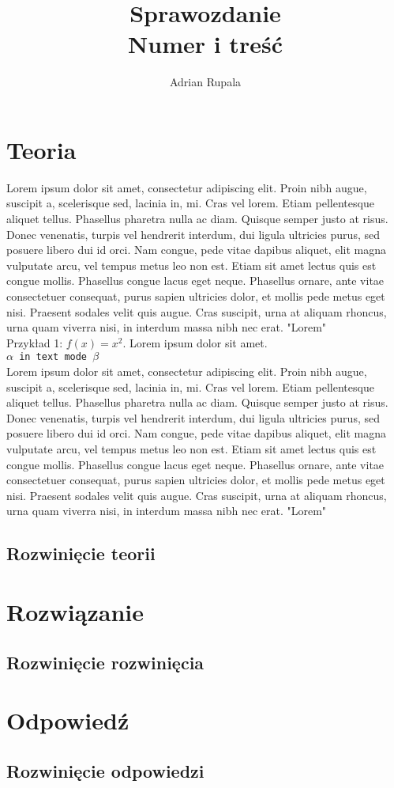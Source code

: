 \documentclass[UTF8]{article}
\title{%
	Sprawozdanie \\
	\large Numer i treść}
\author{Adrian Rupala}
\begin{document}
\maketitle

\newpage
\tableofcontents

\newpage
{}

\section{Teoria}

Lorem ipsum dolor sit amet, consectetur adipiscing elit. Proin nibh augue, suscipit a, scelerisque sed, lacinia in, mi. Cras vel lorem. Etiam pellentesque aliquet tellus. Phasellus pharetra nulla ac diam. Quisque semper justo at risus. Donec venenatis, turpis vel hendrerit interdum, dui ligula ultricies purus, sed posuere libero dui id orci. Nam congue, pede vitae dapibus aliquet, elit magna vulputate arcu, vel tempus metus leo non est. Etiam sit amet lectus quis est congue mollis. Phasellus congue lacus eget neque. Phasellus ornare, ante vitae consectetuer consequat, purus sapien ultricies dolor, et mollis pede metus eget nisi. Praesent sodales velit quis augue. Cras suscipit, urna at aliquam rhoncus, urna quam viverra nisi, in interdum massa nibh nec erat. "Lorem"~\\

Przykład 1: $ f(x) = x^2 $. Lorem ipsum dolor sit amet.~\\

\texttt{$\alpha$ in text mode $\beta$}\\

Lorem ipsum dolor sit amet, consectetur adipiscing elit. Proin nibh augue, suscipit a, scelerisque sed, lacinia in, mi. Cras vel lorem. Etiam pellentesque aliquet tellus. Phasellus pharetra nulla ac diam. Quisque semper justo at risus. Donec venenatis, turpis vel hendrerit interdum, dui ligula ultricies purus, sed posuere libero dui id orci. Nam congue, pede vitae dapibus aliquet, elit magna vulputate arcu, vel tempus metus leo non est. Etiam sit amet lectus quis est congue mollis. Phasellus congue lacus eget neque. Phasellus ornare, ante vitae consectetuer consequat, purus sapien ultricies dolor, et mollis pede metus eget nisi. Praesent sodales velit quis augue. Cras suscipit, urna at aliquam rhoncus, urna quam viverra nisi, in interdum massa nibh nec erat. "Lorem"~

\subsection{Rozwinięcie teorii}

\section{Rozwiązanie}

\subsection{Rozwinięcie rozwinięcia}

\section{Odpowiedź}

\subsection{Rozwinięcie odpowiedzi}
\end{document}
